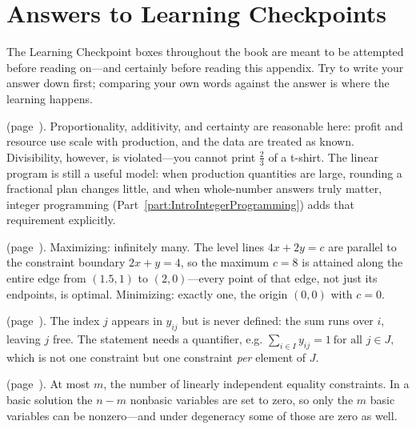 
\chapter{Answers to Learning Checkpoints}
\label{ch:checkpoint-answers}

The Learning Checkpoint boxes throughout the book are meant to be attempted before reading on---and certainly before reading this appendix. Try to write your answer down first; comparing your own words against the answer is where the learning happens.

\bigskip

\noindent\textbf{} (page~\pageref{lc:lp-assumptions}).
Proportionality, additivity, and certainty are reasonable here: profit and resource use scale with production, and the data are treated as known. Divisibility, however, is violated---you cannot print $\tfrac23$ of a t-shirt. The linear program is still a useful model: when production quantities are large, rounding a fractional plan changes little, and when whole-number answers truly matter, integer programming (Part~\ref{part:IntroIntegerProgramming}) adds that requirement explicitly.

\medskip

\noindent\textbf{} (page~\pageref{lc:how-many-optima}).
Maximizing: infinitely many. The level lines $4x+2y=c$ are parallel to the constraint boundary $2x+y=4$, so the maximum $c=8$ is attained along the entire edge from $(1.5,1)$ to $(2,0)$---every point of that edge, not just its endpoints, is optimal. Minimizing: exactly one, the origin $(0,0)$ with $c=0$.

\medskip

\noindent\textbf{} (page~\pageref{lc:missing-index}).
The index $j$ appears in $y_{ij}$ but is never defined: the sum runs over $i$, leaving $j$ free. The statement needs a quantifier, e.g.
\(\sum_{i \in I} y_{ij} = 1 \ \text{for all } j \in J,\)
which is not one constraint but one constraint \emph{per} element of $J$.

\medskip

\noindent\textbf{} (page~\pageref{lc:bfs-nonzero}).
At most $m$, the number of linearly independent equality constraints. In a basic solution the $n-m$ nonbasic variables are set to zero, so only the $m$ basic variables can be nonzero---and under degeneracy some of those are zero as well.


